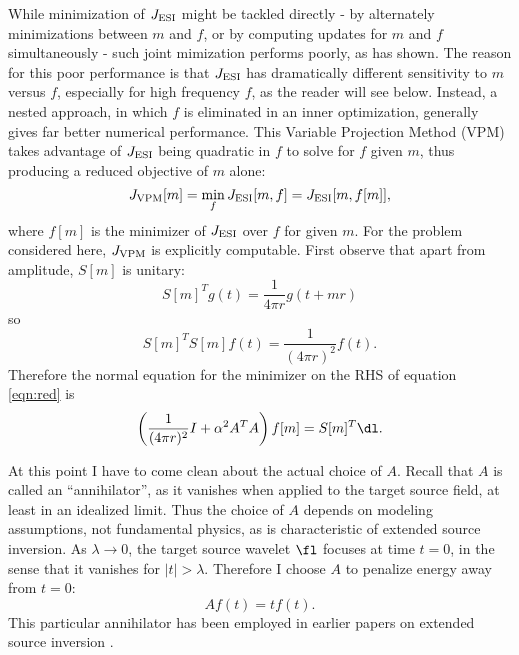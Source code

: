 While minimization of $J_{\rm ESI}$ might be tackled directly - by
alternately minimizations between $m$ and $f$, or by computing updates
for $m$ and $f$ simultaneously - such joint mimization performs
poorly, as \cite{YinHuang:16} has shown. The reason for this poor
performance is that $J_{\rm ESI}$ has dramatically different
sensitivity to $m$ versus $f$, especially for high frequency $f$, as
the reader will see below. Instead, a nested approach, in which $f$ is
eliminated in an inner optimization,
generally gives far better numerical performance.  This Variable
Projection Method (VPM) \cite[]{GolubPereyra:03} takes advantage of
$J_{\rm ESI}$ being quadratic in
$f$ to solve for $f$ given $m$, thus producing a reduced objective of
$m$ alone:
\begin{equation}
\label{eqn:red}
J_{\rm VPM}[m] = \min_f J_{\rm ESI}[m,f] = J_{\rm ESI}[m,f[m]],
\end{equation}
where $f[m]$ is the minimizer of $J_{\rm ESI}$ over $f$ for given $m$.
For the problem considered here, $J_{\rm VPM}$ is explicitly computable. First observe that apart from amplitude, $S[m]$ is unitary:
\begin{equation}
\label{eqn:tran}
S[m]^T g (t) = \frac{1}{4\pi r}g\left(t+mr\right)
\end{equation}
so
\begin{equation}
\label{eqn:unit}
S[m]^TS[m] f (t) = \frac{1}{(4\pi r)^2} f(t).
\end{equation}
Therefore the normal equation for the minimizer on the RHS of equation \ref{eqn:red} is
\begin{equation}
\label{eqn:norm1}
\left(\frac{1}{(4\pi r)^2} I + \alpha^2 A^TA\right)f[m] = S[m]^T\dl.
\end{equation}

At this point I have to come clean about the actual choice of
$A$. Recall that $A$ is called an ``annihilator'', as it vanishes when
applied to the target source field, at least in an idealized
limit. Thus the choice of $A$ depends on modeling assumptions, not
fundamental physics, as is characteristic of extended source
inversion. As $\lambda \rightarrow 0$, the target source wavelet $\fl$
focuses at time $t=0$, in the sense that it vanishes for
$|t| > \lambda$. Therefore I choose $A$ to penalize energy away from
$t=0$:
\begin{equation}
\label{eqn:ann}
Af(t) = tf(t).
\end{equation}
This
particular annihilator has been employed in earlier papers on extended
source inversion
\cite[]{Plessix:00a,LuoSava:11,Warner:14,HuangSymes:SEG15a,Warner:16,HuangSymes:GEO17}.

